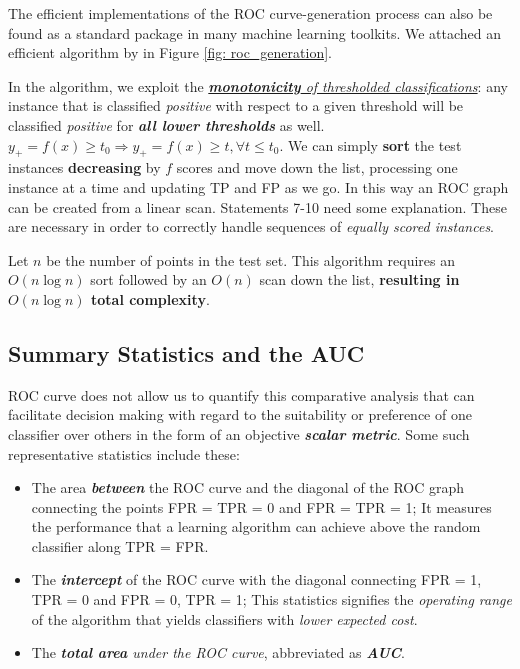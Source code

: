 \documentclass[11pt]{article}
\begin{document}
The efficient implementations of the ROC curve-generation process can also be found as a standard package in many machine learning toolkits. We attached an efficient algorithm by \citep{fawcett2006introduction} in Figure \ref{fig: roc_generation}.


In the algorithm, we exploit the \underline{\emph{\textbf{monotonicity} of thresholded classifications}}: any instance that is classified \emph{positive} with respect to a given threshold will be classified \emph{positive} for \emph{\textbf{all lower thresholds}} as well. $y_{+} = f(x) \ge t_{0} \Rightarrow y_{+} = f(x) \ge t, \forall t \le t_{0}.$ We can simply \textbf{sort} the test instances \textbf{decreasing} by $f$ scores and move down the list, processing one instance at a time and updating TP and FP as we go. In this way an ROC graph can be created from a linear scan. Statements 7-10 need some explanation. These are necessary in order to correctly handle sequences of \emph{equally scored instances}. 

Let $n$ be the number of points in the test set. This algorithm requires an $O(n\log n)$ sort followed by an $O(n)$ scan down the list, \textbf{resulting in $O(n\log n)$ total complexity}.
\subsection{Summary Statistics and the AUC}



ROC curve does not allow us to quantify this comparative analysis that can facilitate decision making with regard to the suitability or preference of one classifier over others in the form of an objective \emph{\textbf{scalar metric}}. Some such representative statistics include these:
\begin{itemize}
\item The area \emph{\textbf{between}} the ROC curve and the diagonal of the ROC graph connecting the points FPR = TPR = 0 and FPR = TPR = 1; It measures the performance that a learning algorithm can achieve above the random classifier along TPR = FPR.
\item The \emph{\textbf{intercept}} of the ROC curve with the diagonal connecting FPR = 1, TPR = 0 and FPR = 0, TPR = 1; This statistics signifies
the \emph{operating range} of the algorithm that yields classifiers with \emph{lower expected cost}.
\item The \emph{\textbf{total area} under the ROC curve}, abbreviated as \emph{\textbf{AUC}}.
\end{itemize}
\end{document}

